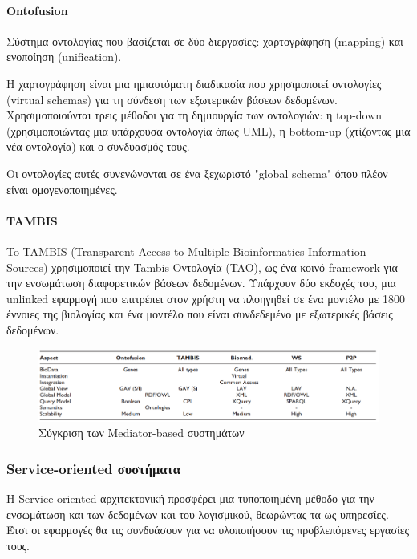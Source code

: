             \paragraph{Ontofusion}
                Σύστημα οντολογίας που βασίζεται σε δύο διεργασίες: χαρτογράφηση (mapping) και ενοποίηση (unification).

                Η χαρτογράφηση είναι μια ημιαυτόματη διαδικασία που χρησιμοποιεί οντολογίες (virtual schemas) για τη σύνδεση των εξωτερικών βάσεων δεδομένων.
                Χρησιμοποιούνται τρεις μέθοδοι για τη δημιουργία των οντολογιών: η top-down (χρησιμοποιώντας μια υπάρχουσα οντολογία όπως UML), η bottom-up (χτίζοντας μια νέα οντολογία) και ο συνδυασμός τους.

                Οι οντολογίες αυτές συνενώνονται σε ένα ξεχωριστό "global schema" όπου πλέον είναι ομογενοποιημένες.  \cite{Ontofusion}

            \paragraph{TAMBIS}
                To TAMBIS (Transparent Access to Multiple Bioinformatics Information Sources) χρησιμοποιεί την Tambis Οντολογία (TAO), ως ένα κοινό framework για την ενσωμάτωση διαφορετικών βάσεων δεδομένων.
                Υπάρχουν δύο εκδοχές του, μια unlinked εφαρμογή που επιτρέπει στον χρήστη να πλοηγηθεί σε ένα μοντέλο με 1800 έννοιες της βιολογίας και ένα μοντέλο που είναι συνδεδεμένο με εξωτερικές βάσεις δεδομένων. \cite{TAMBIS}

            \begin{figure}[ht] \noindent\centering
                \includegraphics[scale=0.7]{img/Mediator based table}
                \caption{Σύγκριση των Mediator-based συστημάτων \cite{XMLbasedApproaches}}
            \end{figure}

        \subsubsection{Service-oriented συστήματα}
            Η Service-oriented αρχιτεκτονική προσφέρει μια τυποποιημένη μέθοδο για την ενσωμάτωση και των δεδομένων και του λογισμικού, θεωρώντας τα ως υπηρεσίες.
            Έτσι οι εφαρμογές θα τις συνδυάσουν για να υλοποιήσουν τις προβλεπόμενες εργασίες τους.

